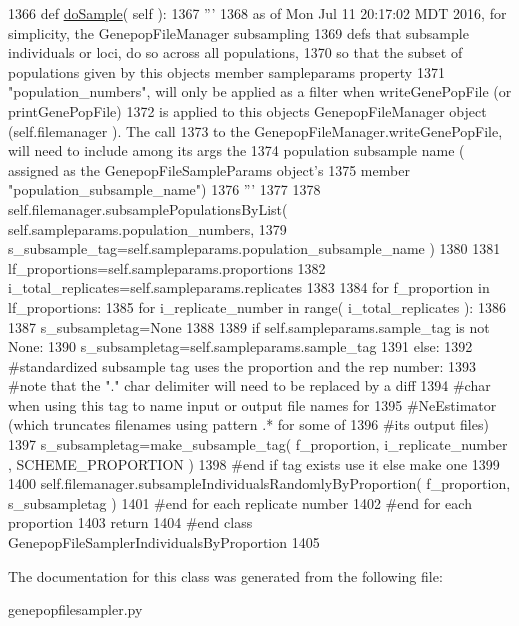\begin{DoxyCode}
1366     \textcolor{keyword}{def }\hyperlink{classnegui_1_1genepopfilesampler_1_1GenepopFileSamplerIndividualsByProportion_ad8170ea6661afa7bff72d484372209e3}{doSample}( self ):
1367         \textcolor{stringliteral}{'''}
1368 \textcolor{stringliteral}{        as of Mon Jul 11 20:17:02 MDT 2016, for simplicity, the GenepopFileManager subsampling}
1369 \textcolor{stringliteral}{        defs that subsample individuals or loci, do so across all populations,}
1370 \textcolor{stringliteral}{        so that the subset of populations given by this objects member sampleparams property }
1371 \textcolor{stringliteral}{        "population\_numbers", will only be applied as a filter when writeGenePopFile (or printGenePopFile)}
1372 \textcolor{stringliteral}{        is applied to this objects GenepopFileManager object (self.filemanager ). The call}
1373 \textcolor{stringliteral}{        to the GenepopFileManager.writeGenePopFile, will need to include among its args the }
1374 \textcolor{stringliteral}{        population subsample name ( assigned as the GenepopFileSampleParams object's}
1375 \textcolor{stringliteral}{        member "population\_subsample\_name") }
1376 \textcolor{stringliteral}{        '''}
1377 
1378         self.filemanager.subsamplePopulationsByList( self.sampleparams.population\_numbers, 
1379                 s\_subsample\_tag=self.sampleparams.population\_subsample\_name )
1380 
1381         lf\_proportions=self.sampleparams.proportions
1382         i\_total\_replicates=self.sampleparams.replicates
1383 
1384         \textcolor{keywordflow}{for} f\_proportion \textcolor{keywordflow}{in} lf\_proportions:
1385             \textcolor{keywordflow}{for} i\_replicate\_number \textcolor{keywordflow}{in} range( i\_total\_replicates ):
1386 
1387                 s\_subsampletag=\textcolor{keywordtype}{None}
1388 
1389                 \textcolor{keywordflow}{if} self.sampleparams.sample\_tag \textcolor{keywordflow}{is} \textcolor{keywordflow}{not} \textcolor{keywordtype}{None}:
1390                     s\_subsampletag=self.sampleparams.sample\_tag
1391                 \textcolor{keywordflow}{else}:
1392                     \textcolor{comment}{#standardized subsample tag uses the proportion and the rep number:}
1393                     \textcolor{comment}{#note that the "." char delimiter will need to be replaced by a diff}
1394                     \textcolor{comment}{#char when using this tag to name input or output file names for}
1395                     \textcolor{comment}{#NeEstimator (which truncates filenames using pattern .* for some of }
1396                     \textcolor{comment}{#its output files)}
1397                     s\_subsampletag=make\_subsample\_tag(  f\_proportion, i\_replicate\_number , 
      SCHEME\_PROPORTION )
1398                 \textcolor{comment}{#end if tag exists use it else make one}
1399 
1400                 self.filemanager.subsampleIndividualsRandomlyByProportion( f\_proportion, s\_subsampletag ) 
1401             \textcolor{comment}{#end for each replicate number  }
1402         \textcolor{comment}{#end for each proportion}
1403         \textcolor{keywordflow}{return}
1404 \textcolor{comment}{#end class GenepopFileSamplerIndividualsByProportion}
1405 
\end{DoxyCode}


The documentation for this class was generated from the following file\+:\begin{DoxyCompactItemize}
\item 
genepopfilesampler.\+py\end{DoxyCompactItemize}
